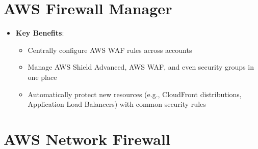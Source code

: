 \documentclass[11pt,a4paper]{report}
\begin{document}
\section{AWS Firewall Manager}

\begin{itemize}
  \item \textbf{Key Benefits}:
\begin{itemize}
  \item Centrally configure AWS WAF rules across accounts
  \item Manage AWS Shield Advanced, AWS WAF, and even security groups in one place
  \item Automatically protect new resources (e.g., CloudFront distributions, Application Load Balancers) with common security rules
\end{itemize}
\end{itemize}


\section{AWS Network Firewall}
\end{document}
